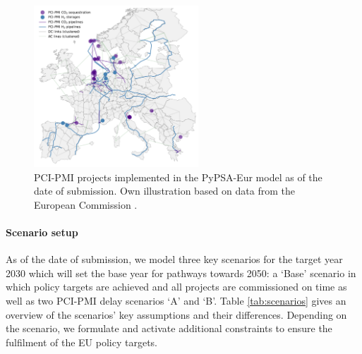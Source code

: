 \documentclass[10pt]{article}
\let\autocite\cite
\begin{document}
\begin{figure}[!htbp]
    \centering
    \includegraphics[width=0.55\textwidth]{pci_pmi_projects_map}
    \caption{PCI-PMI projects implemented in the PyPSA-Eur model as of the date of submission. Own illustration based on data from the European Commission \autocite{europeancommissionPCIPMITransparencyPlatform2024}.}
    \label{fig:pci_pmi_projects_map}
\end{figure}

\paragraph{Scenario setup} As of the date of submission, we model three key scenarios for the target year 2030 which will set the base year for pathways towards 2050: a `Base' scenario in which policy targets are achieved and all projects are commissioned on time as well as two PCI-PMI delay scenarios `A' and `B'. Table \ref{tab:scenarios} gives an overview of the scenarios' key assumptions and their differences. Depending on the scenario, we formulate and activate additional constraints to ensure the fulfilment of the EU policy targets.
\end{document}
